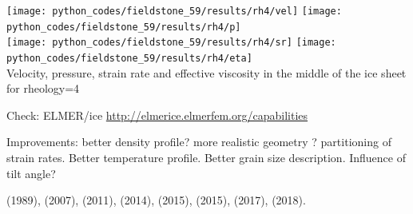 \begin{center}
\texttt{[image: python\_codes/fieldstone\_59/results/rh4/vel]}
\texttt{[image: python\_codes/fieldstone\_59/results/rh4/p]}\\
\texttt{[image: python\_codes/fieldstone\_59/results/rh4/sr]}
\texttt{[image: python\_codes/fieldstone\_59/results/rh4/eta]}\\
{\captionfont Velocity, pressure, strain rate and effective viscosity in the middle of the ice sheet
for rheology=4}
\end{center}



Check: ELMER/ice \url{http://elmerice.elmerfem.org/capabilities}

Improvements: better density profile? more realistic geometry ? 
partitioning of strain rates. Better temperature profile. 
Better grain size description. Influence of tilt angle? 

\vspace{1cm}

\Literature 
\textcite{buja89} (1989),
\textcite{zwgg07} (2007),
\textcite{zhjg11} (2011),
\textcite{lejx14} (2014),
\textcite{issg15} (2015),
\textcite{yash15} (2015),
\textcite{gors17} (2017),
\textcite{heah18} (2018).


